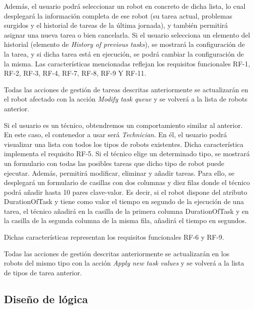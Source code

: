 Además, el usuario podrá seleccionar un robot en concreto de dicha lista, lo cual desplegará la información completa de ese robot (su tarea actual, problemas surgidos y el historial de tareas de la última jornada), y también permitirá asignar una nueva tarea o bien cancelarla. Si el usuario selecciona un elemento del historial (elemento de \textit{History of previous tasks}), se mostrará la configuración de la tarea, y si dicha tarea está en ejecución, se podrá cambiar la configuración de la misma.
Las características mencionadas reflejan los requisitos funcionales RF-1, RF-2, RF-3, RF-4, RF-7, RF-8, RF-9 Y RF-11.

Todas las acciones de gestión de tareas descritas anteriormente se actualizarán en el robot afectado con la acción \textit{Modify task queue} y se volverá a la lista de robots anterior.

Si el usuario es un técnico, obtendremos un comportamiento similar al anterior. En este caso, el contenedor a usar será \textit{Technician}. En él, el usuario podrá visualizar una lista con todos los tipos de robots existentes. Dicha característica implementa el requisito RF-5. Si el técnico elige un determinado tipo, se mostrará un formulario con todas las posibles tareas que dicho tipo de robot puede ejecutar. Además, permitirá modificar, eliminar y añadir tareas. Para ello, se desplegará un formulario de casillas con dos columnas y diez filas donde el técnico podrá añadir hasta 10 pares clave-valor. Es decir, si el robot dispone del atributo DurationOfTask y tiene como valor el tiempo en segundo de la ejecución de una tarea, el técnico añadirá en la casilla de la primera columna DurationOfTask y en la casilla de la segunda columna de la misma fila, añadirá el tiempo en segundos.

Dichas características representan los requisitos funcionales RF-6 y RF-9.

Todas las acciones de gestión descritas anteriormente se actualizarán en los robots del mismo tipo con la acción \textit{Apply new task values} y se volverá a la lista de tipos de tarea anterior.

\subsection{Diseño de lógica}

